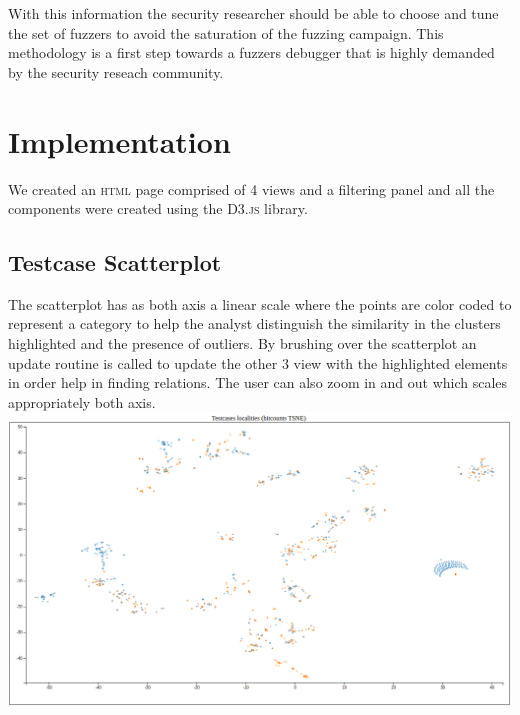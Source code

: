 \documentclass[conference,compsoc]{IEEEtran}
\begin{document}
With this information the security researcher should be able to choose and tune the set of fuzzers to avoid the saturation of the fuzzing campaign. This methodology is a first step towards a fuzzers debugger that is highly demanded by the security reseach community.


\section{Implementation}

We created an \textsc{html} page comprised of 4 views and a filtering panel and all the components were created using the \textsc{D3.js} library.
\subsection{Testcase Scatterplot}
 
The scatterplot has as both axis a linear scale  where the points are color coded to represent a category to help the analyst distinguish the similarity in the clusters highlighted and the presence of outliers.
By brushing over the scatterplot an update routine is called to update the other 3 view with the highlighted elements in order help in finding relations.
The user can also zoom in and out which scales appropriately both axis.
\includegraphics[scale=0.2]{img/scatterplot}
\end{document}

